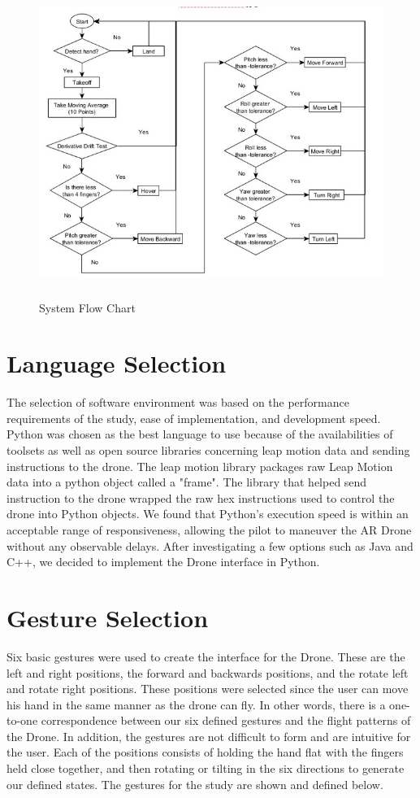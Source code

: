\documentclass[letterpaper,english, 12pt]{article}
\begin{document}
\begin{figure}[H]
	\centering
	\includegraphics[height=10cm,width=130mm]{pics/controlFlowChart.jpg}
	\caption{System Flow Chart}
\end{figure}


\section*{Language Selection}

The selection of software environment was based on the performance requirements of the study, ease of implementation, and development speed. Python was chosen as the best language to use because of the availabilities of toolsets as well as open source libraries concerning leap motion data and sending instructions to the drone. The leap motion library packages raw Leap Motion data into a python object called a "frame"\cite{cit9}. The library that helped send instruction to the drone wrapped the raw hex instructions used to control the drone into Python objects. We found that Python's execution speed is within an acceptable range of responsiveness, allowing the pilot to maneuver the AR Drone without any observable delays. After investigating a few options such as Java and C++, we decided to implement the Drone interface in Python.

\section*{Gesture Selection}

Six basic gestures were used to create the interface for the Drone. These are the left and right positions, the forward and backwards positions, and the rotate left and rotate right positions. These positions were selected since the user can move his hand in the same manner as the drone can fly. In other words, there is a one-to-one correspondence between our six defined gestures and the flight patterns of the Drone. In addition, the gestures are not difficult to form and are intuitive for the user.  Each of the positions consists of holding the hand flat with the fingers held close together, and then rotating or tilting in the six directions to generate our defined states. The gestures for the study are shown and defined below.
\end{document}
